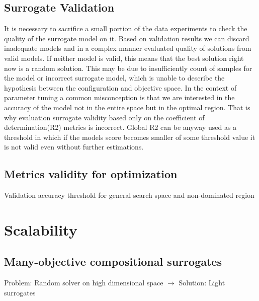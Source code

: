         \subsection{Surrogate Validation}
        It is necessary to sacrifice a small portion of the data experiments to check the quality of the surrogate model on it. Based on validation results we can discard inadequate models and in a complex manner evaluated quality of solutions from valid models. If neither model is valid, this means that the best solution right now is a random solution. This may be due to insufficiently count of samples for the model or incorrect surrogate model, which is unable to describe the hypothesis between the configuration and objective space. 
        In the context of parameter tuning a common misconception is that we are interested in the accuracy of the model not in the entire space but in the optimal region. That is why evaluation surrogate validity based only on the coefficient of determination(R2) metrics is incorrect. Global R2 can be anyway used as a threshold in which if the models score becomes smaller of some threshold value it is not valid even without further estimations. 

        \subsection{Metrics validity for optimization}
        Validation accuracy threshold for general search space and non-dominated region
    



    
    \section{Scalability}

        \subsection{Many-objective compositional surrogates}
        Problem: Random solver on high dimensional space $\rightarrow$ Solution: Light surrogates 


